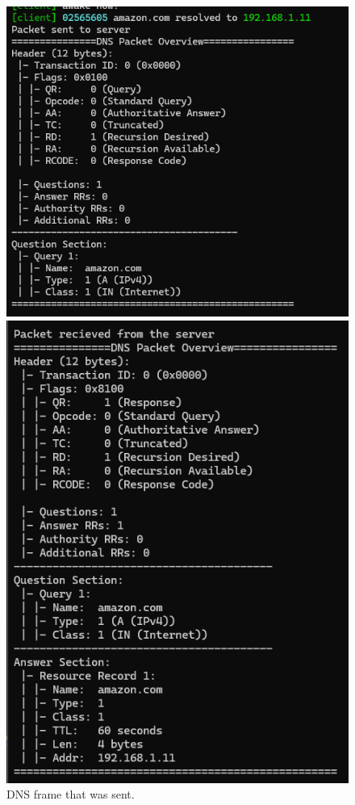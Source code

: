 \documentclass{article}
\begin{document}
\begin{figure}[H]
    \centering
    \begin{minipage}[t]{0.46\textwidth}
        \centering
        \includegraphics[width=\textwidth]{paccket_sent.png}
        \caption{DNS frame that was sent.}
    \end{minipage}%
    \hfill
    \begin{minipage}[t]{0.46\textwidth}
        \centering
        \includegraphics[width=\textwidth]{packet_recieved.png}

\end{minipage}
\end{figure}
\end{document}
